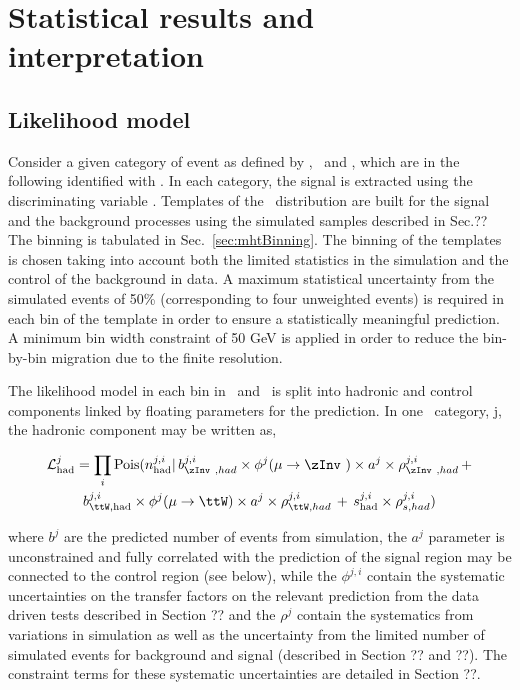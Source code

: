 \chapter{Statistical results and interpretation}
\section{Likelihood model}
\label{sec:likelihood}

Consider a given category of event as defined by \njet, \nb~and \scalht, which are in the following identified with \htcat. 
In each category, the signal is extracted using the discriminating variable \mht. 
Templates of the \mht~distribution are built for the signal and the background processes 
using the simulated samples described in Sec.?? The \mht binning is tabulated in Sec.~\ref{sec:mhtBinning}.
The binning of the templates is chosen taking into account both the limited statistics in the simulation and 
the control of the background in data. 
A maximum statistical uncertainty from the simulated events of 50\% (corresponding to four unweighted events) 
is required in each bin of the template in order to ensure a statistically meaningful prediction. 
A minimum bin width constraint of 50 GeV is applied in order to reduce the bin-by-bin migration 
due to the finite \mht resolution.

The likelihood model in each bin in \mht~and \htcat~is split into hadronic and control components linked
by floating parameters for the prediction. In one \htcat~category, j, the hadronic component may be written as,

\begin{multline}
\label{eq:hadronicLikelihood}
\mathcal{L}^{j}_{\mathrm{had}} = \prod_i \mathrm{Pois}(n^{j,i}_{\mathrm{had}} |\, b^{j,i}_{\zInv~,had}\times\phi^{j}(\mu\rightarrow\zInv~)\times a^{j}\times\rho^{j,i}_{\zInv~,had}\, + \\ 
b^{j,i}_{\ttW,\mathrm{had}}\times\phi^{j}(\mu\rightarrow\ttW)\times a^{j}\times\rho^{j,i}_{\ttW,had}\, + \,s^{j,i}_{\mathrm{had}}\times\rho^{j,i}_{s,had})
\end{multline}

where $b^{j}$ are the predicted number of events from simulation, the $a^{j}$ parameter is unconstrained and 
fully correlated with the prediction of the signal region may be connected 
to the control region (see below), while the $\phi^{j,i}$ contain the systematic uncertainties on the 
transfer factors on the relevant prediction from the data driven tests described in Section ?? and the 
$\rho^{j}$ contain the systematics from variations in simulation as well as the uncertainty from the limited number of 
simulated events for background and signal (described in Section ?? and ??). The constraint terms
for these systematic uncertainties are detailed in Section ??.

